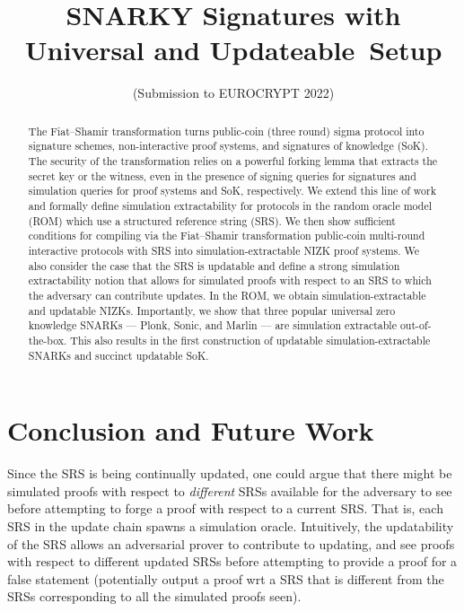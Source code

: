 \documentclass{llncs}
\title{SNARKY Signatures with Universal and Updateable~Setup}
\author{(Submission to EUROCRYPT 2022)}
\institute{}
\begin{document}
 \sloppy
\maketitle

\begin{abstract}
The Fiat--Shamir transformation turns public-coin (three round) sigma protocol into signature schemes, non-interactive proof systems, and signatures of knowledge (SoK).  The security of the transformation relies on a powerful forking lemma that extracts the secret key or the witness, even in the presence of signing queries for signatures and simulation queries for proof systems and SoK, respectively.
We extend this line of work and formally define simulation extractability for protocols in the random oracle model (ROM) which use a structured reference string (SRS). We then show sufficient conditions for compiling via the Fiat--Shamir transformation public-coin multi-round interactive protocols with SRS into simulation-extractable NIZK proof systems. We also consider the case that the SRS is updatable and define a strong simulation extractability notion that allows for simulated proofs with respect to an SRS to which the adversary can contribute updates.
In the ROM, we obtain simulation-extractable and updatable NIZKs. Importantly, we show that three popular universal zero knowledge SNARKs --- Plonk, Sonic, and Marlin --- are simulation extractable out-of-the-box. This also results in the first construction of updatable simulation-extractable SNARKs and succinct updatable SoK.
\end{abstract}

\ifupdate
%



%




\section{Conclusion and Future Work}

Since the SRS is being continually updated, one could argue that there might be simulated proofs with respect to \textit{different} SRSs available for the adversary to see before attempting to forge a proof with respect to a current SRS.
That is, each SRS in the update chain spawns a simulation oracle. Intuitively, the updatability of the SRS allows an adversarial prover to contribute to updating, and see proofs with respect to different updated SRSs before attempting to provide a proof for a false statement (potentially output a proof wrt a SRS that is different from the SRSs corresponding to all the simulated proofs seen).
\end{document}
